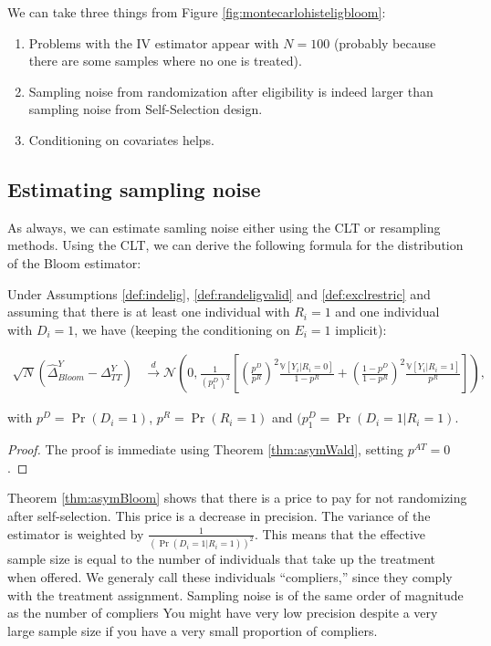 \documentclass[]{book}
\providecommand{\tightlist}{%
  \setlength{\itemsep}{0pt}\setlength{\parskip}{0pt}}
\newcommand{\var}[1]{\mathbb{V}[ #1 ]}
\theoremstyle{definition}
\theoremstyle{definition}
\theoremstyle{definition}
\theoremstyle{remark}
\let\BeginKnitrBlock\begin \let\EndKnitrBlock\end
\begin{document}
We can take three things from Figure \ref{fig:montecarlohisteligbloom}:

\begin{enumerate}
\def\labelenumi{\arabic{enumi}.}
\tightlist
\item
  Problems with the IV estimator appear with \(N=100\) (probably because there are some samples where no one is treated).
\item
  Sampling noise from randomization after eligibility is indeed larger than sampling noise from Self-Selection design.
\item
  Conditioning on covariates helps.
\end{enumerate}

\hypertarget{estimating-sampling-noise-2}{%
\subsection{Estimating sampling noise}\label{estimating-sampling-noise-2}}

As always, we can estimate samling noise either using the CLT or resampling methods.
Using the CLT, we can derive the following formula for the distribution of the Bloom estimator:

\BeginKnitrBlock{theorem}[Asymptotic Distribution of $\hat{\Delta}^Y_{Bloom}$]
\protect\hypertarget{thm:asymBloom}{}{\label{thm:asymBloom} \iffalse (Asymptotic Distribution of \(\hat{\Delta}^Y_{Bloom}\)) \fi{} }Under Assumptions \ref{def:indelig}, \ref{def:randeligvalid} and \ref{def:exclrestric} and assuming that there is at least one individual with \(R_i=1\) and one individual with \(D_i=1\), we have (keeping the conditioning on \(E_i=1\) implicit):

\begin{align*}
  \sqrt{N}(\hat{\Delta}^Y_{Bloom}-\Delta^Y_{TT}) &  \stackrel{d}{\rightarrow}
  \mathcal{N}\left(0,\frac{1}{(p^{D}_1)^2}\left[\left(\frac{p^D}{p^R}\right)^2\frac{\var{Y_i|R_i=0}}{1-p^R}+\left(\frac{1-p^D}{1-p^R}\right)^2\frac{\var{Y_i|R_i=1}}{p^R}\right]\right),
\end{align*}
\EndKnitrBlock{theorem}

with \(p^D=\Pr(D_i=1)\), \(p^R=\Pr(R_i=1)\) and \((p^{D}_1=\Pr(D_i=1|R_i=1)\).

\BeginKnitrBlock{proof}
\iffalse{} {Proof. } \fi{}The proof is immediate using Theorem \ref{thm:asymWald}, setting \(p^{AT}=0\).
\EndKnitrBlock{proof}

\BeginKnitrBlock{remark}
\iffalse{} {Remark. } \fi{}Theorem \ref{thm:asymBloom} shows that there is a price to pay for not randomizing after self-selection.
This price is a decrease in precision.
The variance of the estimator is weighted by \(\frac{1}{(\Pr(D_i=1|R_i=1))^2}\).
This means that the effective sample size is equal to the number of individuals that take up the treatment when offered.
We generaly call these individuals ``compliers,'' since they comply with the treatment assignment.
Sampling noise is of the same order of magnitude as the number of compliers
You might have very low precision despite a very large sample size if you have a very small proportion of compliers.
\EndKnitrBlock{remark}
\end{document}
